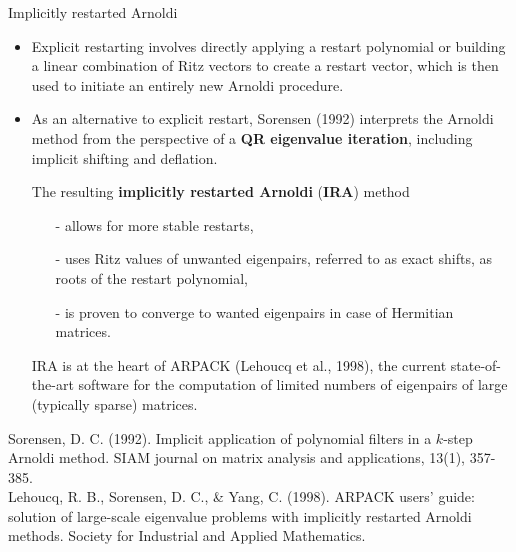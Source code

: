 \documentclass[t,usepdftitle=false]{beamer}
\begin{document}
\begin{frame}{Implicitly restarted Arnoldi}
\begin{itemize}
\item Explicit restarting involves directly applying a restart polynomial or building a linear combination of Ritz vectors to create a restart vector, which is then used to initiate an entirely new Arnoldi procedure.
\item As an alternative to explicit restart, Sorensen (1992) interprets the Arnoldi method from the perspective of a \textbf{QR eigenvalue iteration}, including implicit shifting and deflation.
\item[] The resulting \textbf{implicitly restarted Arnoldi} (\textbf{IRA}) method
\begin{itemize}\normalsize
\item[-] allows for more stable restarts,
\item[-] uses Ritz values of unwanted eigenpairs, referred to as exact shifts, as roots of the restart polynomial,
\item[-] is proven to converge to wanted eigenpairs in case of Hermitian matrices.
\end{itemize}
\item[] IRA is at the heart of ARPACK (Lehoucq et al., 1998), the current state-of-the-art software for the computation of limited numbers of eigenpairs of large (typically sparse) matrices.
\end{itemize}\smallskip
\tiny{Sorensen, D. C. (1992). Implicit application of polynomial filters in a $k$-step Arnoldi method. SIAM journal on matrix analysis and applications, 13(1), 357-385.}\tinyskip\\
\tiny{Lehoucq, R. B., Sorensen, D. C., \& Yang, C. (1998). ARPACK users' guide: solution of large-scale eigenvalue problems with implicitly restarted Arnoldi methods. Society for Industrial and Applied Mathematics.}
\end{frame}
\end{document}
